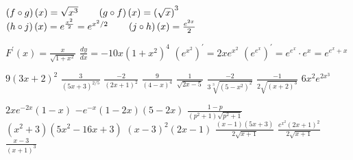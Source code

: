 \begin{Answer}[ref={exPQCRules}]
\Question $\left (f \circ g\right ) \left (x\right ) =\sqrt{x^{3}}\text{\quad \quad }\left (g \circ f\right ) \left (x\right ) =\left (\sqrt{x}\right )^{3}$
\Question $\left (h \circ j\right ) \left (x\right ) =e^{\frac{x^{2}}{2}} =e^{x^{2}/2}\text{\quad \quad }\left (j \circ h\right ) \left (x\right ) =\frac{e^{2 x}}{2}$
\Question %
\begin{tasks}
	\task $F^{ \prime } (x) =\frac{x}{\sqrt{1 +x^{2}}}$ 
	\task $\frac{d y}{d x} = -10 x \left (1 +x^{2}\right )^{4}$ 	
	\task $\left (e^{x^{2}}\right )^{ \prime } =2 x e^{x^{2}}$ 
	\task $\left (e^{e^{x}}\right )^{ \prime } =e^{e^{x}} \cdot e^{x} =e^{e^{x} +x}$
\end{tasks}

\Question %
\begin{tasks}
	\task $9 \left (3 x +2\right )^{2}$
	\task $\frac{3}{\left (5 x +3\right )^{2/5}}$
	\task $\frac{ -2}{\left (2 x +1\right )^{2}}$ 
	\task $\frac{9}{\left (4 -x\right )^{4}}$ 	
	\task $\frac{1}{\sqrt{2 x -5}}$ 
	\task $\frac{ -2}{3 \sqrt[{3}]{\left (5 -x^{2}\right )^{2}}}$ 
	\task $\frac{ -1}{2 \sqrt{\left (x +2\right )^{3}}}$ 
	\task $6 x^{2} e^{2 x^{3}}$ 
\end{tasks}

\Question %
\begin{tasks}
	\task $2 x e^{ -2 x} \left (1 -x\right )$
	\task $ -e^{ -x} (1 -2 x) \left (5 -2 x\right )$ 
	\task $\frac{1 -p}{\left (p^{2} +1\right ) \sqrt{p^{2} +1}}$
	\task $\left (x^{2} +3\right ) \left (5 x^{2} -16 x +3\right )$ 
	\task $\left (x -3\right )^{2} \left (2 x -1\right )$ 
	\task $\frac{\left (x -1\right ) \left (5 x +3\right )}{2 \sqrt{x +1}}$ 
	\task $\frac{e^{x^{2}} \left (2 x +1\right )^{2}}{2 \sqrt{x +1}}$ 
	\task $\frac{x -3}{\left (x +1\right )^{3}}$
\end{tasks}	
\end{Answer}%

